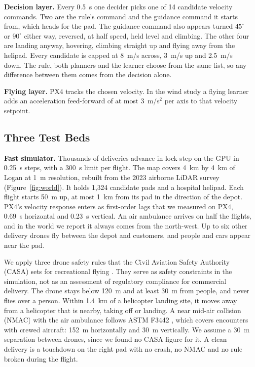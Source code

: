 \textbf{Decision layer.} Every 0.5~s one decider picks one of 14 candidate velocity commands. Two are the rule's command and the guidance command it starts from, which heads for the pad. The guidance command also appears turned $45^\circ$ or $90^\circ$ either way, reversed, at half speed, held level and climbing. The other four are landing anyway, hovering, climbing straight up and flying away from the helipad. Every candidate is capped at 8~m/s across, 3~m/s up and 2.5~m/s down. The rule, both planners and the learner choose from the same list, so any difference between them comes from the decision alone.

\textbf{Flying layer.} PX4 tracks the chosen velocity. In the wind study a flying learner adds an acceleration feed-forward of at most 3~m/s$^2$ per axis to that velocity setpoint.

\subsection{Three Test Beds}

\textbf{Fast simulator.} Thousands of deliveries advance in lock-step on the GPU in 0.25~s steps, with a 300~s limit per flight. The map covers 4~km by 4~km of Logan at 1~m resolution, rebuilt from the 2023 airborne LiDAR survey (Figure~\ref{fig:world}). It holds 1,324 candidate pads and a hospital helipad. Each flight starts 50~m up, at most 1~km from its pad in the direction of the depot. PX4's velocity response enters as first-order lags that we measured on PX4, 0.69~s horizontal and 0.23~s vertical. An air ambulance arrives on half the flights, and in the world we report it always comes from the north-west. Up to six other delivery drones fly between the depot and customers, and people and cars appear near the pad.

We apply three drone safety rules that the Civil Aviation Safety Authority (CASA) sets for recreational flying \cite{casa2026}. They serve as safety constraints in the simulation, not as an assessment of regulatory compliance for commercial delivery. The drone stays below 120~m and at least 30~m from people, and never flies over a person. Within 1.4~km of a helicopter landing site, it moves away from a helicopter that is nearby, taking off or landing. A near mid-air collision (NMAC) with the air ambulance follows ASTM F3442 \cite{astm2023}, which covers encounters with crewed aircraft: 152~m horizontally and 30~m vertically. We assume a 30~m separation between drones, since we found no CASA figure for it. A clean delivery is a touchdown on the right pad with no crash, no NMAC and no rule broken during the flight.

